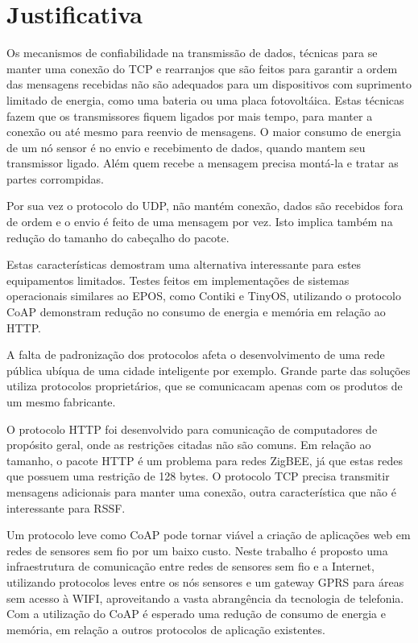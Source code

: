 \section{Justificativa}

Os mecanismos de confiabilidade na transmiss\~ao de dados, t\'ecnicas para se manter uma conex\~ao do TCP e rearranjos que s\~ao feitos para garantir a ordem das mensagens recebidas n\~ao s\~ao adequados para um dispositivos com suprimento limitado de energia, como uma bateria ou uma placa fotovolt\'aica. Estas t\'ecnicas fazem que os transmissores fiquem ligados por mais tempo, para manter a conex\~ao ou at\'e mesmo para reenvio de mensagens. O maior consumo de energia de um n\'o sensor \'e no envio e recebimento de dados, quando mantem seu transmissor ligado. Al\'em quem recebe a mensagem precisa mont\'a-la e tratar as partes corrompidas.

Por sua vez o protocolo do UDP, n\~ao mant\'em conex\~ao, dados s\~ao recebidos fora de ordem e o envio \'e feito de uma mensagem por vez.  Isto implica tamb\'em na redu\c{c}\~ao do tamanho do cabe\c{c}alho do pacote.

Estas caracter\'isticas demostram uma alternativa interessante para estes equipamentos limitados. Testes feitos em implementa\c{c}\~oes de sistemas operacionais similares ao EPOS, como Contiki e TinyOS, utilizando o protocolo CoAP demonstram redu\c{c}\~ao no consumo de energia e mem\'oria em rela\c{c}\~ao ao HTTP.\cite{transportApp}

A falta de padroniza\c{c}\~ao dos protocolos afeta o desenvolvimento de uma rede p\'ublica ub\'iqua de uma cidade inteligente por exemplo. Grande parte das solu\c{c}\~oes utiliza protocolos propriet\'arios, que se comunicacam apenas com os produtos de um mesmo fabricante.

O protocolo HTTP foi desenvolvido para comunica\c{c}\~ao de computadores de prop\'osito geral, onde as restri\c{c}\~oes citadas n\~ao s\~ao comuns. Em rela\c{c}\~ao ao tamanho, o pacote HTTP \'e um problema para redes ZigBEE, j\'a que estas redes que possuem uma restri\c{c}\~ao de 128 bytes. O protocolo TCP precisa transmitir mensagens adicionais para manter uma conex\~ao, outra caracter\'istica que n\~ao \'e interessante para RSSF.

Um protocolo leve como CoAP pode tornar vi\'avel a cria\c{c}\~ao de aplica\-\c{c}\~oes web em redes de sensores sem fio por um baixo custo. Neste trabalho \'e proposto uma infraestrutura de comunica\c{c}\~ao entre redes de sensores sem fio e a Internet, utilizando protocolos leves entre os n\'os sensores e um gateway GPRS para \'areas sem acesso \`a WIFI, aproveitando a vasta abrang\^encia da tecnologia de telefonia. Com a utiliza\c{c}\~ao do CoAP \'e esperado uma redu\c{c}\~ao de consumo de energia e mem\'oria, em rela\c{c}\~ao a outros protocolos de aplica\c{c}\~ao existentes.

